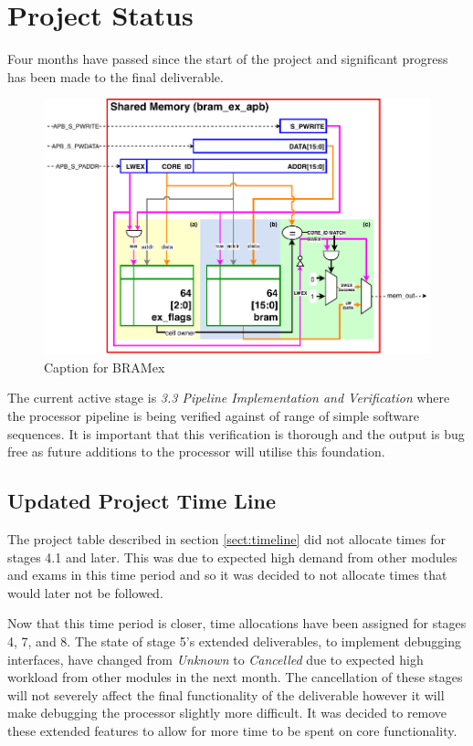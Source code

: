 \documentclass[11pt,a4paper]{report}
\begin{document}
{\section{Project Status}
Four months have passed since the start of the project and significant progress has been made to the final deliverable. 


\begin{figure}[H]
\centering 
\includegraphics[width=15cm]{../img/bram_ex}
\caption{Caption for BRAMex}
\label{fig:ex}
\end{figure}

The current active stage is \textit{3.3 Pipeline Implementation and Verification} where the processor pipeline is being verified against of range of simple software sequences. It is important that this verification is thorough and the output is bug free as future additions to the processor will utilise this foundation.

\subsection{Updated Project Time Line}
The project table described in section \ref{sect:timeline} did not allocate times for stages 4.1 and later. This was due to expected high demand from other modules and exams in this time period and so it was decided to not allocate times that would later not be followed.

Now that this time period is closer, time allocations have been assigned for stages 4, 7, and 8. The state of stage 5's extended deliverables, to implement debugging interfaces, have changed from \textit{Unknown} to \textit{Cancelled} due to expected high workload from other modules in the next month. The cancellation of these stages will not severely affect the final functionality of the deliverable however it will make debugging the processor slightly more difficult. It was decided to remove these extended features to allow for more time to be spent on core functionality.

}
\end{document}

